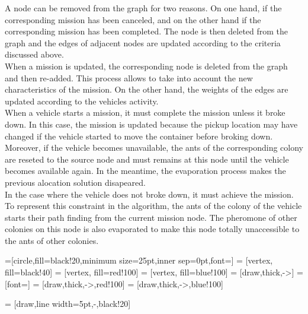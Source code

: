 \documentclass[a4paper,12pt]{article}
\begin{document}
A node can be removed from the graph for two reasons. On one hand, if the corresponding mission has been canceled, and on the other hand if the corresponding mission has been completed. The node is then deleted from the graph and the edges of adjacent nodes are updated according to the criteria discussed above.
\\

When a mission is updated, the corresponding node is deleted from the graph and then re-added. This process allows to take into account the new characteristics of the mission. On the other hand, the weights of the edges are updated according to the vehicles activity.
\\

When a vehicle starts a mission, it must complete the mission unless it broke down. In this case, the mission is updated because the pickup location may have changed if the vehicle started to move the container before broking down. Moreover, if the vehicle becomes unavailable, the ants of the corresponding colony are reseted to the source node and must remains at this node until the vehicle becomes available again. In the meantime, the evaporation process makes the previous alocation solution disapeared.\\

In the case where the vehicle does not broke down, it must achieve the mission. To represent this constraint in the algorithm, the ants of the colony of the vehicle starts their path finding from the current mission node. The pheromone of other colonies on this node is also evaporated to make this node totally unaccessible to the ants of other colonies.


=[circle,fill=black!20,minimum size=25pt,inner sep=0pt,font=\tiny]
 = [vertex, fill=black!40]
 = [vertex, fill=red!100]
 = [vertex, fill=blue!100]
 = [draw,thick,->]
 = [font=\small]
 = [draw,thick,->,red!100]
 = [draw,thick,->,blue!100]

 = [draw,line width=5pt,-,black!20]
\end{document}
